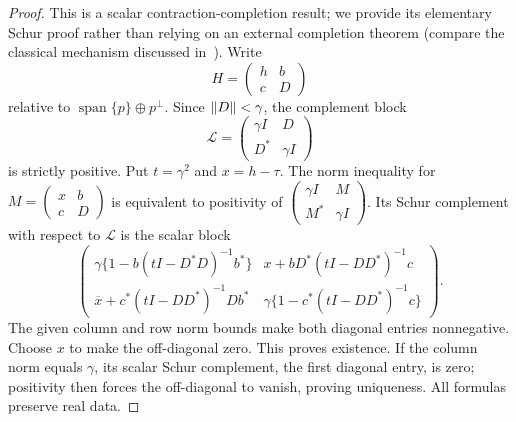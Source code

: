 \begin{proof}
This is a scalar contraction-completion result; we provide its elementary
Schur proof rather than relying on an external completion theorem (compare
the classical mechanism discussed in~\cite{parrott2025}). Write
\[
 H=\begin{pmatrix}h&b\\c&D\end{pmatrix}
\]
relative to $\operatorname{span}\{p\}\oplus p^\perp$. Since
$\left\lVert D\right\rVert<\gamma$, the complement block
\[
 \mathcal L=\begin{pmatrix}\gamma I&D\\D^*&\gamma I\end{pmatrix}
\]
is strictly positive. Put $t=\gamma^2$ and $x=h-\tau$.
The norm inequality for $M=\left(\begin{smallmatrix}x&b\\c&D\end{smallmatrix}\right)$
is equivalent to positivity of
$\left(\begin{smallmatrix}\gamma I&M\\M^*&\gamma I\end{smallmatrix}\right)$.
Its Schur complement with respect to $\mathcal L$ is the scalar block
\[
 \begin{pmatrix}
 \gamma\{1-b(tI-D^*D)^{-1}b^*\}
 &x+bD^*(tI-DD^*)^{-1}c\\
 \overline x+c^*(tI-DD^*)^{-1}Db^*
 &\gamma\{1-c^*(tI-DD^*)^{-1}c\}
 \end{pmatrix}.
\]
The given column and row norm bounds make both diagonal entries
nonnegative. Choose $x$ to make the off-diagonal zero. This proves
existence. If the column norm equals $\gamma$, its scalar Schur
complement, the first diagonal entry, is zero; positivity then forces the
off-diagonal to vanish, proving uniqueness. All formulas preserve real
data.
\end{proof}
